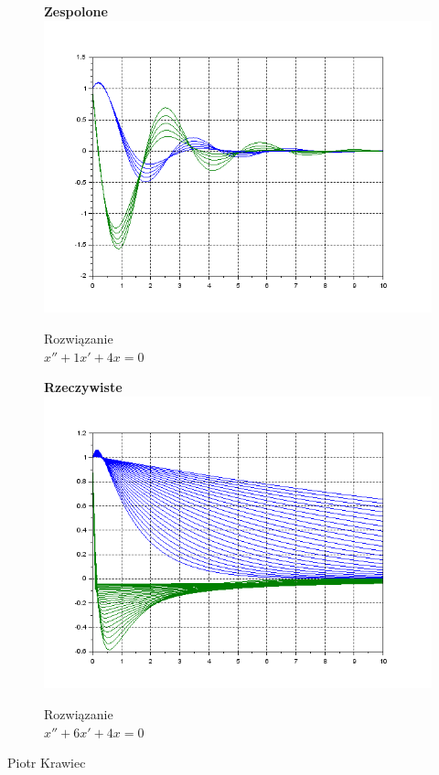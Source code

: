 \documentclass[12pt]{article}
\begin{document}
\begin{figure}[H]
  \centering
  \hspace{-1.6cm}
  \begin{minipage}[b]{0.49\textwidth}
  \hspace{1.6cm}
  \centering
   \textbf{Zespolone}
    \includegraphics[scale=0.47]{./img/5-zespolone-xy-11}
    \caption{Rozwiązanie \\ \centering$x''+1x'+4x=0$}
  \end{minipage}
  \hfill
  \begin{minipage}[b]{0.49\textwidth}
  \centering
  \hspace{1.6cm}
  \textbf{Rzeczywiste}
    \includegraphics[scale=0.47]{./img/5-rzeczywiste-xy-11}
    \caption{Rozwiązanie \\ \centering$x''+6x'+4x=0$}
  \end{minipage}
\end{figure}

\null\hfill Piotr Krawiec
\end{document}
